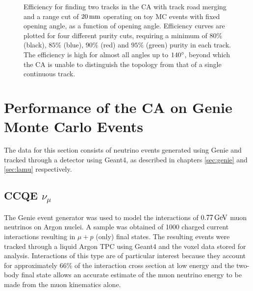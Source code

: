 \begin{figure}
\centering
{}
\caption[Efficiency for finding 2 tracks for CA with merging and range cut operating on toy MC events]{\label{fig:ca_toy_rcut_twotrack_efficiency}Efficiency for finding two tracks in the \ac{CA} with track road merging and a range cut of $20\,\mathrm{mm}$ operating on toy MC events with fixed opening angle, as a function of opening angle. Efficiency curves are plotted for four different purity cuts, requiring a minimum of $80\%$ (black), $85\%$ (blue), $90\%$ (red) and $95\%$ (green) purity in each track. The efficiency is high for almost all angles up to $140^\circ$, beyond which the \ac{CA} is unable to distinguish the topology from that of a single continuous track.}
\end{figure}


\section{Performance of the \acl{CA} on Genie Monte Carlo Events}
The data for this section consists of neutrino events generated using Genie and tracked through a detector using Geant4, as described in chapters \ref{sec:genie} and \ref{sec:lamu} respectively.

\subsection{CCQE $\nu_\mu$}
The Genie event generator was used to model the interactions of $0.77\,\mathrm{GeV}$ muon neutrinos on Argon nuclei. A sample was obtained of 1000 charged current interactions resulting in $\mu + p$ (only) final states. The resulting events were tracked through a liquid Argon TPC using Geant4 and the voxel data stored for analysis. Interactions of this type are of particular interest because they account for approximately 66\% of the interaction cross section at low energy and the two-body final state allows an accurate estimate of the muon neutrino energy to be made from the muon kinematics alone.

